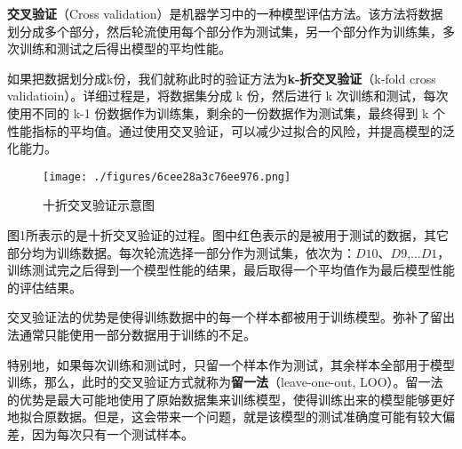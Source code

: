 
\textbf{交叉验证}（Cross validation）是机器学习中的一种模型评估方法。该方法将数据划分成多个部分，然后轮流使用每个部分作为测试集，另一个部分作为训练集，多次训练和测试之后得出模型的平均性能。

如果把数据划分成k份，我们就称此时的验证方法为\textbf{k-折交叉验证}（k-fold cross validatioin）。详细过程是，将数据集分成 k 份，然后进行 k 次训练和测试，每次使用不同的 k-1 份数据作为训练集，剩余的一份数据作为测试集，最终得到 k 个性能指标的平均值。通过使用交叉验证，可以减少过拟合的风险，并提高模型的泛化能力。

\begin{figure}[ht]
\centering
\texttt{[image: ./figures/6cee28a3c76ee976.png]}
\caption{十折交叉验证示意图} \label{fig_CroVal_1}
\end{figure}
图1所表示的是十折交叉验证的过程。图中红色表示的是被用于测试的数据，其它部分均为训练数据。每次轮流选择一部分作为测试集，依次为：$D10$、$D9$,...$D1$，训练测试完之后得到一个模型性能的结果，最后取得一个平均值作为最后模型性能的评估结果。

交叉验证法的优势是使得训练数据中的每一个样本都被用于训练模型。弥补了留出法通常只能使用一部分数据用于训练的不足。

特别地，如果每次训练和测试时，只留一个样本作为测试，其余样本全部用于模型训练，那么，此时的交叉验证方式就称为\textbf{留一法}（leave-one-out, LOO）。留一法的优势是最大可能地使用了原始数据集来训练模型，使得训练出来的模型能够更好地拟合原数据。但是，这会带来一个问题，就是该模型的测试准确度可能有较大偏差，因为每次只有一个测试样本。